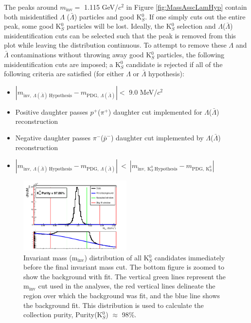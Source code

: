 \documentclass[../AnalysisNoteJBuxton.tex]{subfiles}
\begin{document}
The peaks around $m_{\mathrm{inv}} = $ 1.115 GeV/$c^{2}$ in Figure \ref{fig:MassAsscLamHyp} contain both misidentified $\Lambda$ ($\bar{\Lambda}$) particles and good K$^{0}_{S}$.
If one simply cuts out the entire peak, some good K$^{0}_{S}$ particles will be lost.
Ideally, the K$^{0}_{S}$ selection and $\Lambda$($\bar{\Lambda}$) misidentification cuts can be selected such that the peak is removed from this plot while leaving the distribution continuous.
To attempt to remove these $\Lambda$ and $\bar{\Lambda}$ contaminations without throwing away good K$^{0}_{S}$ particles, the following misidentification cuts are imposed; a K$^{0}_{S}$ candidate is rejected if all of the following criteria are satisfied (for either $\Lambda$ or $\bar{\Lambda}$ hypothesis):
\begin{itemize}
 \item $\left|m_{\mathrm{inv}, \ \Lambda(\bar{\Lambda}) \ \mathrm{Hypothesis}} - m_{\mathrm{PDG},\ \Lambda(\bar{\Lambda})}\right| < $ 9.0 MeV/$c^{2}$
 \item Positive daughter passes $p^{+}$($\pi^{+}$) daughter cut implemented for $\Lambda$($\bar{\Lambda}$) reconstruction
 \item Negative daughter passes $\pi^{-}$($\bar{p}^{-}$) daughter cut implemented by $\Lambda$($\bar{\Lambda}$) reconstruction
 \item $\left|m_{\mathrm{inv}, \ \Lambda(\bar{\Lambda}) \ \mathrm{Hypothesis}} - m_{\mathrm{PDG},\ \Lambda(\bar{\Lambda})}\right|~ < ~\left|m_{\mathrm{inv},~ \mathrm{K}^{0}_{S}~ \mathrm{Hypothesis}} - m_{\mathrm{PDG},~ \mathrm{K}^{0}_{S}}\right|$
\end{itemize} 


\begin{figure}[h]
  \centering
  \includegraphics[width=0.5\textwidth]{3_DataSelection/Figures/K0Purity_LamK0.pdf}
  \caption[K$^{0}_{S}$ Purity]{Invariant mass (m$_{\mathrm{inv}}$) distribution of all K$^{0}_{S}$ candidates immediately before the final invariant mass cut.  The bottom figure is zoomed to show the background with fit.  The vertical green lines represent the m$_{\mathrm{inv}}$ cut used in the analyses, the red vertical lines delineate the region over which the background was fit, and the blue line shows the background fit.  This distribution is used to calculate the collection purity, Purity(K$^{0}_{S}$) $\approx$ 98\%.}
  \label{fig:K0Purity}
\end{figure}
\end{document}
